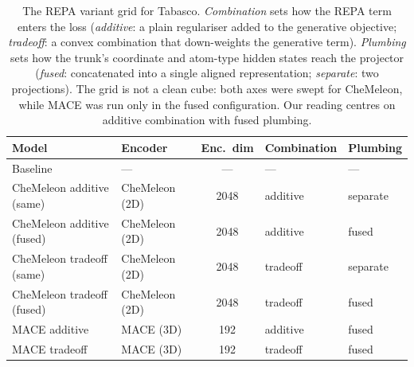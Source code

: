 \begin{table}[tbp]
\centering
\small
\begin{tabular}{l l c l l}
\toprule
\textbf{Model} & \textbf{Encoder} & \textbf{Enc.\ dim} & \textbf{Combination} & \textbf{Plumbing} \\
\midrule
Baseline & --- & --- & --- & --- \\
\midrule
CheMeleon additive (same)    & CheMeleon (2D) & 2048 & additive & separate \\
CheMeleon additive (fused)   & CheMeleon (2D) & 2048 & additive & fused \\
CheMeleon tradeoff (same)    & CheMeleon (2D) & 2048 & tradeoff & separate \\
CheMeleon tradeoff (fused)   & CheMeleon (2D) & 2048 & tradeoff & fused \\
MACE additive                & MACE (3D)      & 192  & additive & fused \\
MACE tradeoff                & MACE (3D)      & 192  & tradeoff & fused \\
\bottomrule
\end{tabular}
\caption{The REPA variant grid for Tabasco. \emph{Combination} sets how the REPA term enters the loss (\emph{additive}: a plain regulariser added to the generative objective; \emph{tradeoff}: a convex combination that down-weights the generative term). \emph{Plumbing} sets how the trunk's coordinate and atom-type hidden states reach the projector (\emph{fused}: concatenated into a single aligned representation; \emph{separate}: two projections). The grid is not a clean cube: both axes were swept for CheMeleon, while MACE was run only in the fused configuration. Our reading centres on additive combination with fused plumbing.}
\label{tab:tabasco-variants}
\end{table}
